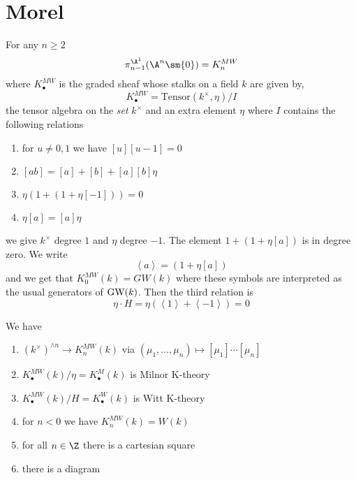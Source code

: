 \documentclass{article}
\begin{document}
\section{Morel}

\begin{theorem}
For any $n \ge 2$ 
\[ \pi_{n-1}^{\A^1}(\A^{n} \sm \{ 0 \}) = K^{MW}_n \]
where $K^{MW}_\bullet$ is the graded sheaf whose stalks on a field $k$ are given by,
\[ K^{MW}_\bullet = \text{Tensor}(k^\times, \eta) / I \]
the tensor algebra on the \textit{set} $k^\times$ and an extra element $\eta$ where $I$ contains the following relations
\begin{enumerate}
\item for $u \neq 0,1$ we have $[u] [u-1] = 0$
\item $[ab] = [a] + [b] + [a][b] \eta$
\item $\eta (1 + (1 + \eta [-1])) = 0$
\item $\eta [a] = [a] \eta$
\end{enumerate} 
we give $k^\times$ degree $1$ and $\eta$ degree $-1$. The element $1 + (1 + \eta [a])$ is in degree zero. We write
\[ \left< a \right> = (1 + \eta [a]) \]
and we get that $K_0^{MW}(k) = GW(k)$ where these symbols are interpreted as the usual generators of $\mathrm{GW}(k)$. Then the third relation is
\[ \eta \cdot H = \eta \left( \left<1 \right> +  \left< - 1 \right> \right) = 0 \]
\end{theorem}

\begin{rmk}
We have
\begin{enumerate}
\item $(k^\times)^{\wedge n} \to K_n^{MW}(k)$ via $(\mu_1, \dots, \mu_n) \mapsto [\mu_1] \cdots [\mu_n]$
\item $K_\bullet^{MW}(k) / \eta = K_\bullet^M(k)$ is Milnor K-theory
\item $K_\bullet^{MW}(k) / H = K_\bullet^W(k)$ is Witt K-theory
\item for $n < 0$ we have $K_n^{MW}(k) = W(k)$
\item for all $n \in \Z$ there is a cartesian square
\begin{center}
\end{center}
\item there is a diagram
\begin{center}
\end{center}
\end{enumerate}
\end{rmk}
\end{document}
